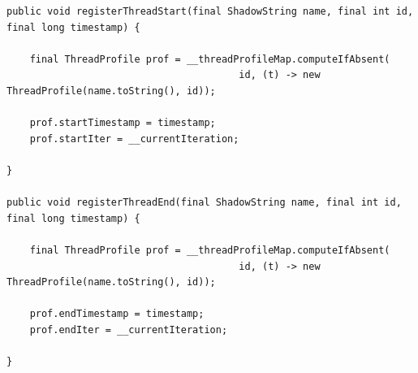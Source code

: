 \documentclass[]{usiinfthesis}
\begin{document}
    \vspace*{0.25cm}
        \begin{verbatim}
public void registerThreadStart(final ShadowString name, final int id, final long timestamp) {

    final ThreadProfile prof = __threadProfileMap.computeIfAbsent(
                                        id, (t) -> new ThreadProfile(name.toString(), id));

    prof.startTimestamp = timestamp;
    prof.startIter = __currentIteration;

}

public void registerThreadEnd(final ShadowString name, final int id, final long timestamp) {

    final ThreadProfile prof = __threadProfileMap.computeIfAbsent(
                                        id, (t) -> new ThreadProfile(name.toString(), id));

    prof.endTimestamp = timestamp;
    prof.endIter = __currentIteration;

}
    \end{verbatim}
    \vspace*{0.25cm}
    
\end{document}
